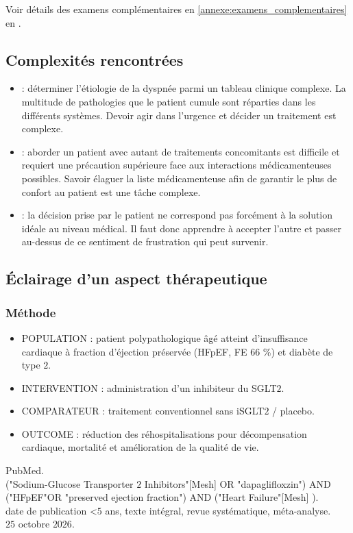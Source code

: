 Voir détails des examens complémentaires en \cref{annexe:examens_complementaires} en .

\subsection{Complexités rencontrées}
\begin{itemize}[label=\textbullet]
    \item {} : déterminer l’étiologie de la dyspnée parmi un tableau clinique complexe. La multitude de pathologies que le patient cumule sont réparties dans les différents systèmes. Devoir agir dans l’urgence et décider un traitement est complexe.
    \item {} : aborder un patient avec autant de traitements concomitants est difficile et requiert une précaution supérieure face aux interactions médicamenteuses possibles. Savoir élaguer la liste médicamenteuse afin de garantir le plus de confort au patient est une tâche complexe.
    \item {} : la décision prise par le patient ne correspond pas forcément à la solution idéale au niveau médical. Il faut donc apprendre à accepter l’autre et passer au-dessus de ce sentiment de frustration qui peut survenir.
    \end{itemize}
\subsection{Éclairage d’un aspect thérapeutique}
\subsubsection{Méthode}
\begin{itemize}[label=\textbullet]
    \item POPULATION : patient polypathologique âgé atteint d'insuffisance cardiaque à fraction d'éjection préservée (HFpEF, FE $66$ \%) et diabète de type $2$.
    \item INTERVENTION : administration d'un inhibiteur du SGLT$2$.
    \item COMPARATEUR : traitement conventionnel sans iSGLT$2$ / placebo.
    \item OUTCOME : réduction des réhospitalisations pour décompensation cardiaque, mortalité et amélioration de la qualité de vie.
    \end{itemize}
 PubMed.\\
 ("Sodium-Glucose Transporter $2$ Inhibitors"[Mesh] OR "dapaglifloxzin") AND ("HFpEF"OR "preserved ejection fraction") AND ("Heart Failure"[Mesh] ).\\
 date de publication <$5$ ans, texte intégral, revue systématique, méta-analyse.\\
 $25$ octobre $2026$.


